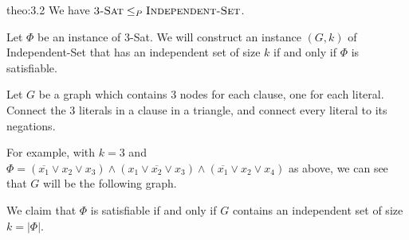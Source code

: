 \begin{theo}{theo:3.2}
    We have $\textsc{3-Sat} \leq_P \textsc{Independent-Set}$.
\end{theo}
\begin{pf}
    Let $\Phi$ be an instance of {\sc $3$-Sat}. We will construct an instance 
    $(G, k)$ of {\sc Independent-Set} that has an independent set of size $k$ 
    if and only if $\Phi$ is satisfiable. 

    Let $G$ be a graph which contains $3$ nodes for each clause, one for 
    each literal. Connect the $3$ literals in a clause in a triangle, 
    and connect every literal to its negations. 

    For example, with $k = 3$ and $\Phi = (\overline{x_1} \vee x_2 \vee x_3) 
    \wedge (x_1 \vee \overline{x_2} \vee x_3) \wedge (\overline{x_1} \vee 
    x_2 \vee x_4)$ as above, we can see that $G$ will be the following graph. 

    \begin{center}
    \end{center}
    We claim that $\Phi$ is satisfiable if and only if $G$ contains 
    an independent set of size $k = |\Phi|$. 


\end{pf}
